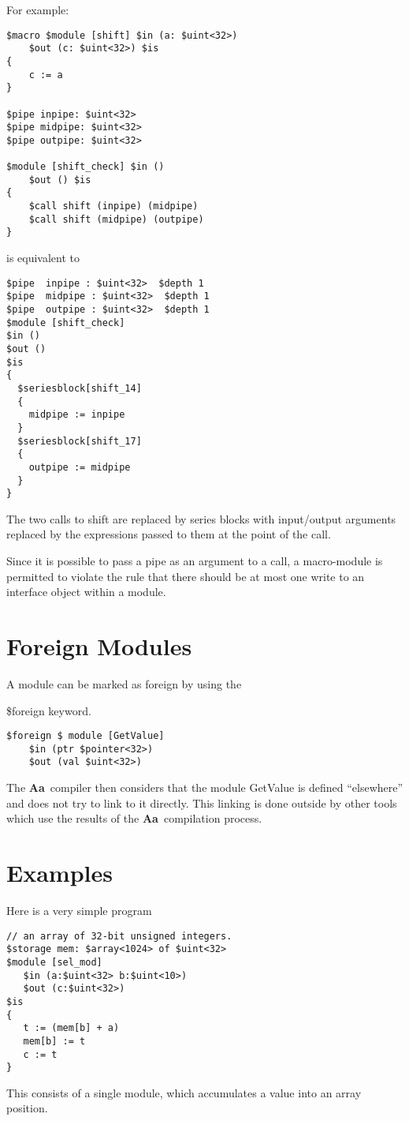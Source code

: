 \documentclass{article}
\newcommand{\Aa}{{\bf Aa}~}
\begin{document}
For example:
\begin{verbatim}
$macro $module [shift] $in (a: $uint<32>) 
    $out (c: $uint<32>) $is
{
    c := a 
}  

$pipe inpipe: $uint<32>
$pipe midpipe: $uint<32>
$pipe outpipe: $uint<32>

$module [shift_check] $in () 
    $out () $is
{
    $call shift (inpipe) (midpipe)
    $call shift (midpipe) (outpipe)
}

\end{verbatim}
is equivalent to 
\begin{verbatim}
$pipe  inpipe : $uint<32>  $depth 1 
$pipe  midpipe : $uint<32>  $depth 1 
$pipe  outpipe : $uint<32>  $depth 1 
$module [shift_check]
$in ()
$out ()
$is
{
  $seriesblock[shift_14] 
  {
    midpipe := inpipe
  }
  $seriesblock[shift_17] 
  {
    outpipe := midpipe
  }
}
\end{verbatim}
The two calls to shift are replaced by
series blocks with input/output arguments
replaced by the expressions passed to them
at the point of the call.

Since it is possible to pass a pipe as an 
argument to a call, a macro-module is permitted
to violate the rule that there should
be at most one write to an interface object
within a module.

\section{Foreign Modules}


A module can be marked as foreign by using the

\$foreign keyword.
\begin{verbatim}
$foreign $ module [GetValue]
	$in (ptr $pointer<32>)
	$out (val $uint<32>)
\end{verbatim}

The \Aa compiler then considers that the module GetValue
is defined ``elsewhere'' and does not try to link to it
directly.  This linking is done outside by other tools which
use the results of the \Aa compilation process.

\section{Examples}


Here is a very simple program
\begin{verbatim}
// an array of 32-bit unsigned integers.
$storage mem: $array<1024> of $uint<32> 
$module [sel_mod]
   $in (a:$uint<32> b:$uint<10>)
   $out (c:$uint<32>)
$is
{
   t := (mem[b] + a)
   mem[b] := t
   c := t
}
\end{verbatim}
This consists of a single module, which accumulates
a value into an array position.
\end{document}
